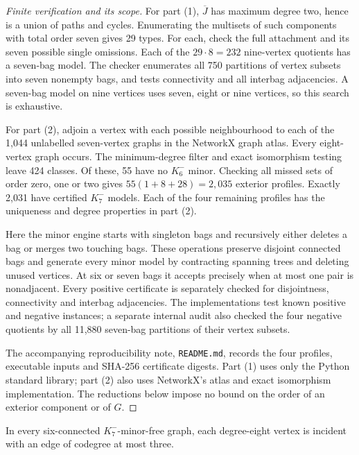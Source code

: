 \begin{proof}[Finite verification and its scope]
For part (1), $\overline J$ has maximum degree two, hence is a union of
paths and cycles.  Enumerating the multisets of such components with total
order seven gives 29 types.  For each, check the full attachment and its
seven possible single omissions.  Each of the $29\cdot8=232$ nine-vertex
quotients has a seven-bag model.  The checker enumerates all 750 partitions
of vertex subsets into seven nonempty bags, and tests connectivity and all
interbag adjacencies.  A seven-bag model on nine vertices uses seven, eight
or nine vertices, so this search is exhaustive.

For part (2), adjoin a vertex with each possible neighbourhood to each of
the 1,044 unlabelled seven-vertex graphs in the NetworkX graph atlas.
Every eight-vertex graph occurs.  The minimum-degree filter and exact
isomorphism testing leave 424 classes.
Of these, 55 have no $K_6^{-}$ minor.  Checking all missed sets of order
zero, one or two gives $55(1+8+28)=2,035$ exterior profiles.  Exactly 2,031
have certified $K_7^{-}$ models.  Each of the four remaining profiles
has the uniqueness and degree properties in part (2).

Here the minor engine starts with singleton bags and recursively either
deletes a bag or merges two touching bags.  These operations preserve
disjoint connected bags and generate every minor model by contracting
spanning trees and deleting unused vertices.  At six or seven bags it
accepts precisely when at most one pair is nonadjacent.  Every positive
certificate is separately checked for disjointness, connectivity and
interbag adjacencies.  The implementations test known positive and negative
instances; a separate internal audit also checked the four negative
quotients by all 11,880 seven-bag partitions of their vertex subsets.

The accompanying reproducibility note, \texttt{README.md}, records the
four profiles, executable inputs and SHA-256 certificate digests.
Part (1) uses only the Python standard library; part (2) also uses
NetworkX's atlas and exact isomorphism implementation.  The reductions
below impose no bound on the order of an exterior component or of $G$.
\end{proof}

\begin{theorem}\label{thm:six-connected-eight}
In every six-connected $K_7^{-}$-minor-free graph, each degree-eight vertex
is incident with an edge of codegree at most three.
\end{theorem}

